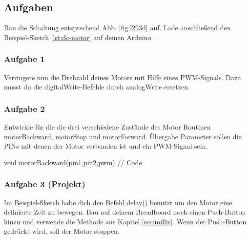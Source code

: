 \subsection{Aufgaben}
Bau die Schaltung entsprechend Abb. \ref{fig:l293d} auf. Lade anschließend den Beispiel-Sketch \ref{lst:dc-motor} auf deinen Arduino.

\subsubsection{Aufgabe 1}
Verringere nun die Drehzahl deines Motors mit Hilfe eines PWM-Signals. Dazu musst du die digitalWrite-Befehle durch analogWrite ersetzen.

\subsubsection{Aufgabe 2}
Entwickle für die die drei verschiedene Zustände des Motor Routinen motorBackward, motorStop und motorForward. Übergabe Parameter sollen die PINs mit denen der Motor verbunden ist und ein PWM-Signal sein. 
\begin{arduinoCode}{}{}
void motorBackward(pin1,pin2,pwm) {
  // Code
}
\end{arduinoCode}

\subsubsection{Aufgabe 3 (Projekt)}
Im Beispiel-Sketch habe dich den Befehl delay() benutzt um den Motor eine definierte Zeit zu bewegen. Bau auf deinem Breadboard noch einen Push-Button hinzu und verwende die Methode aus Kapitel \ref{sec:millis}. Wenn der Push-Button gedrückt wird, soll der Motor stoppen. 


